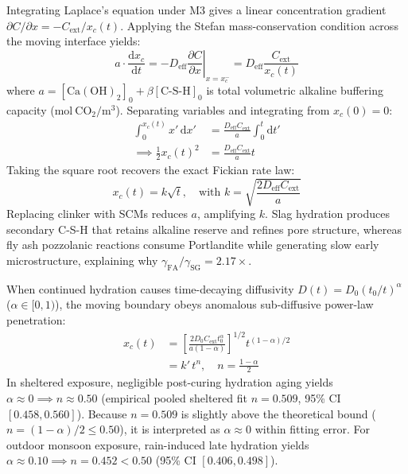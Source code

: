 \documentclass[journal]{IEEEtran}
\begin{document}
Integrating Laplace's equation under M3 gives a linear concentration gradient $\partial C / \partial x = -C_{\mathrm{ext}} / x_c(t)$. Applying the Stefan mass-conservation condition across the moving interface yields:
\begin{equation}
a \cdot \frac{\mathrm{d}x_c}{\mathrm{d}t} = -D_{\mathrm{eff}} \left. \frac{\partial C}{\partial x} \right|_{x = x_c^-} = D_{\mathrm{eff}} \frac{C_{\mathrm{ext}}}{x_c(t)}
\label{eq:stefan_front}
\end{equation}
where $a = [\mathrm{Ca(OH)}_2]_0 + \beta [\mathrm{C}\text{-}\mathrm{S}\text{-}\mathrm{H}]_0$ is total volumetric alkaline buffering capacity ($\mathrm{mol\ CO_2 / m^3}$). Separating variables and integrating from $x_c(0) = 0$:
\begin{equation}
\begin{aligned}
\int_0^{x_c(t)} x' \,\mathrm{d}x'
&= \frac{D_{\mathrm{eff}} C_{\mathrm{ext}}}{a} \int_0^t \mathrm{d}t' \\
\implies \frac{1}{2} x_c(t)^2
&= \frac{D_{\mathrm{eff}} C_{\mathrm{ext}}}{a} t
\end{aligned}
\label{eq:stefan_integral}
\end{equation}
Taking the square root recovers the exact Fickian rate law:
\begin{equation}
x_c(t) = k \sqrt{t}, \quad \text{with } k = \sqrt{\frac{2 D_{\mathrm{eff}} C_{\mathrm{ext}}}{a}}
\label{eq:fickian_k}
\end{equation}
Replacing clinker with SCMs reduces $a$, amplifying $k$. Slag hydration produces secondary C-S-H that retains alkaline reserve and refines pore structure, whereas fly ash pozzolanic reactions consume Portlandite while generating slow early microstructure, explaining why $\gamma_{\mathrm{FA}} / \gamma_{\mathrm{SG}} = 2.17\times$.

When continued hydration causes time-decaying diffusivity $D(t) = D_0 (t_0/t)^\alpha$ ($\alpha \in [0, 1)$), the moving boundary obeys anomalous sub-diffusive power-law penetration:
\begin{equation}
\begin{aligned}
x_c(t) &= \left[ \frac{2 D_0 C_{\mathrm{ext}} t_0^\alpha}{a (1 - \alpha)} \right]^{1/2} t^{(1 - \alpha)/2} \\
&= k' \, t^n, \quad n = \frac{1 - \alpha}{2}
\end{aligned}
\label{eq:power_law}
\end{equation}
In sheltered exposure, negligible post-curing hydration aging yields $\alpha \approx 0 \implies n \approx 0.50$ (empirical pooled sheltered fit $n = 0.509$, 95\% CI $[0.458, 0.560]$). Because $n = 0.509$ is slightly above the theoretical bound ($n = (1 - \alpha)/2 \le 0.50$), it is interpreted as $\alpha \approx 0$ within fitting error. For outdoor monsoon exposure, rain-induced late hydration yields $\alpha \approx 0.10 \implies n = 0.452 < 0.50$ (95\% CI $[0.406, 0.498]$).
\end{document}
